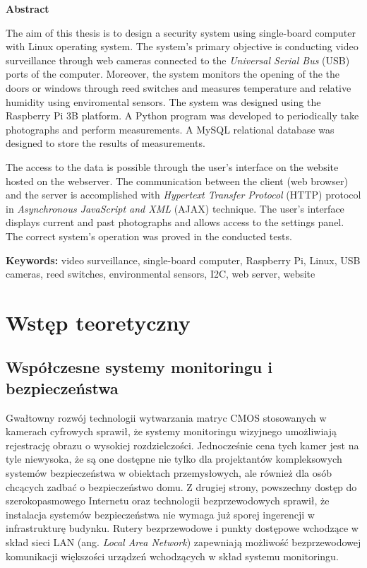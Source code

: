 \documentclass[a4paper,11pt,twoside]{article}
\begin{document}
\begin{center}
\textbf{Abstract}
\end{center}

\noindent
The aim of this thesis is to design a security system using single-board computer with Linux operating system. The system's primary objective is conducting video surveillance through web cameras connected to the \textit{Universal Serial Bus} (USB) ports of the computer. Moreover, the system monitors the opening of the the doors or windows through reed switches and measures temperature and relative humidity using enviromental sensors. The system was designed using the Raspberry Pi 3B platform. A Python program was developed to periodically take photographs and perform measurements. A MySQL relational database was designed to store the results of measurements.

The access to the data is possible through the user’s interface on the website hosted on the webserver. The communication between the client (web browser) and the server is accomplished with \textit{Hypertext Transfer Protocol} (HTTP) protocol in \textit{Asynchronous JavaScript and XML} (AJAX) technique. The user’s interface displays current and past photographs and allows access to the settings panel. The correct system's operation was proved in the conducted tests.

\vspace{11pt}
\noindent
\textbf{Keywords:} video surveillance, single-board computer, Raspberry Pi, Linux, USB cameras, reed switches, environmental sensors, I2C, web server, website 
\newpage

\null
\thispagestyle{empty}
\newpage




\tableofcontents
\setcounter{tocdepth}{2}
\newpage

\section{Wstęp teoretyczny}

\subsection{Współczesne systemy monitoringu i bezpieczeństwa}
Gwałtowny rozwój technologii wytwarzania matryc CMOS stosowanych w kamerach cyfrowych sprawił, że systemy monitoringu wizyjnego umożliwiają rejestrację obrazu o wysokiej rozdzielczości. Jednocześnie cena tych kamer jest na tyle niewysoka, że są one dostępne nie tylko dla projektantów kompleksowych systemów bezpieczeństwa w obiektach przemysłowych, ale również dla osób chcących zadbać o bezpieczeństwo domu. Z drugiej strony, powszechny dostęp do szerokopasmowego Internetu oraz technologii bezprzewodowych sprawił, że  instalacja systemów bezpieczeństwa nie wymaga już sporej ingerencji w infrastrukturę budynku. Rutery bezprzewodowe i punkty dostępowe wchodzące w skład sieci LAN (ang. \textit{Local Area Network}) zapewniają możliwość bezprzewodowej komunikacji większości urządzeń wchodzących w skład systemu monitoringu.
\end{document}
